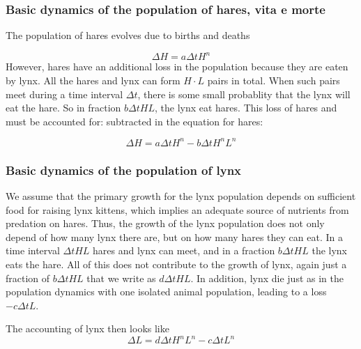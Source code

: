 \documentclass{beamer}
\begin{document}
\begin{frame}
\frametitle{Basic dynamics of the population of hares, vita e morte}

\begin{block}{}
The population of hares evolves due to births and deaths

\[
\Delta H = a \Delta t H^n
\]
However, hares have an additional loss in the population because
they are eaten by lynx.
All the hares and lynx can form
$H\cdot L$ pairs in total. When such pairs meet during a time
interval $\Delta t$, there is some
small probablity that the lynx will eat the hare.
So in fraction $b\Delta t HL$, the lynx eat hares. This
loss of hares and must be accounted for:
subtracted in the equation for hares:

\[ \Delta H = a\Delta t H^n - b \Delta t H^nL^n\]
\end{block}
\end{frame}

\begin{frame}
\frametitle{Basic dynamics of the population of lynx}

\begin{block}{}
We assume that the primary growth for the lynx population depends on sufficient food for raising lynx kittens, which implies an adequate source of nutrients from predation on hares. Thus, the growth of the lynx population does not only depend of how many lynx there are, but on how many hares they can eat.
In a time interval $\Delta t HL$ hares and lynx can meet, and in a
fraction $b\Delta t HL$ the lynx eats the hare. All of this does not
contribute to the growth of lynx, again just a fraction of
$b\Delta t HL$ that we write as
$d\Delta t HL$. In addition, lynx die just as in the population
dynamics with one isolated animal population, leading to a loss
$-c\Delta t L$.
\end{block}

\begin{block}{}
The accounting of lynx then looks like
\[ \Delta L = d\Delta t H^nL^n - c\Delta t L^n\]
\end{block}
\end{frame}
\end{document}
